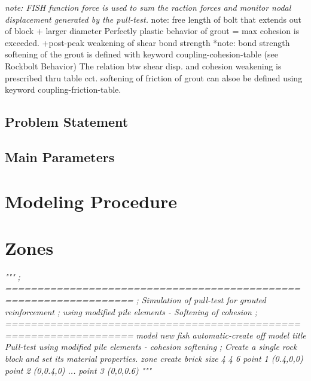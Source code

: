 \documentclass[a4paper, nobind]{templates/ociamthesis}
\newenvironment{Shaded}{\begin{snugshade}}{\end{snugshade}}
\newcommand{\CommentTok}[1]{\textcolor[rgb]{0.56,0.35,0.01}{\textit{#1}}}
\renewenvironment{Shaded}
{
  \vspace{10pt}%
  \begin{snugshade}%
}{%
  \end{snugshade}%
  \vspace{8pt}%
}
\begin{document}
\emph{note: FISH function force is used to sum the raction forces and
monitor nodal displacement generated by the pull-test.
}note: free length of bolt that extends out of block + larger diameter
Perfectly plastic behavior of grout = max cohesion is exceeded.
+post-peak weakening of shear bond strength
*note: bond strength softening of the grout is defined with keyword
coupling-cohesion-table (see Rockbolt Behavior)
The relation btw shear disp. and cohesion weakening is prescribed
thru table cct. softening of friction of grout can alsoe be defined
using keyword coupling-friction-table.

\hypertarget{problem-statement-2}{%
\subsection{Problem Statement}\label{problem-statement-2}}

\hypertarget{main-parameters-2}{%
\subsection{Main Parameters}\label{main-parameters-2}}

\hypertarget{modeling-procedure-2}{%
\section{Modeling Procedure}\label{modeling-procedure-2}}

\hypertarget{zones-4}{%
\section{Zones}\label{zones-4}}

\begin{Shaded}
\begin{Highlighting}[]
\CommentTok{"""}
\CommentTok{; ==================================================================}
\CommentTok{;   Simulation of pull{-}test for grouted reinforcement}
\CommentTok{;   using modified pile elements {-} Softening of cohesion}
\CommentTok{; ==================================================================}
\CommentTok{model new }
\CommentTok{fish automatic{-}create off}
\CommentTok{model title \textquotesingle{}Pull{-}test using modified pile elements {-} cohesion softening\textquotesingle{}}
\CommentTok{; Create a single rock block and set its material properties.}
\CommentTok{zone create brick size 4 4 6 point 1 (0.4,0,0) point 2 (0,0.4,0) ...}
\CommentTok{                             point 3 (0,0,0.6)}
\CommentTok{"""}
\end{Highlighting}
\end{Shaded}
\end{document}
